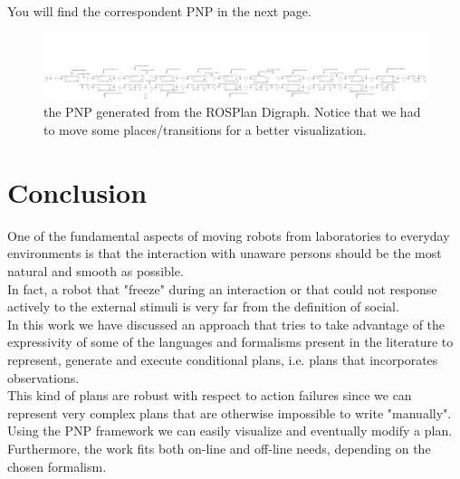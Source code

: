 \documentclass[pdftex,12pt,a4paper]{report}
\begin{document}
\noindent You will find the correspondent PNP in the next page.\\

\newpage
\begin{figure}[H]
	\centering
	\includegraphics[scale=0.13, angle=270, trim=100mm -100mm 0mm 0mm]{images/rosplan_ex1.png}
	\caption{the PNP generated from the ROSPlan Digraph. Notice that we had to move some places/transitions for a better visualization.}
\end{figure}
\newpage

\chapter{Conclusion}\label{sec:conclusion}
One of the fundamental aspects of moving robots from laboratories to everyday environments is that the interaction with unaware persons should be the most natural and smooth as possible.\\
In fact, a robot that "freeze" during an interaction or that could not response actively to the external stimuli is very far from the definition of social.\\
In this work we have discussed an approach that tries to take advantage of the expressivity of some of the languages and formalisms present in the literature to represent, generate and execute conditional plans, i.e. plans that incorporates observations.\\
This kind of plans are robust with respect to action failures since we can represent very complex plans that are otherwise impossible to write "manually". \\
Using the PNP framework we can easily visualize and eventually modify a plan.\\
Furthermore, the work fits both on-line and off-line needs, depending on the chosen formalism.    
\end{document}
